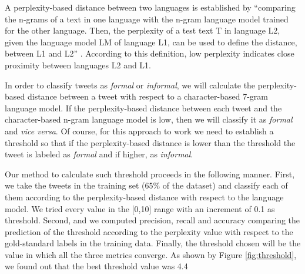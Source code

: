 \documentclass[information,article,submit,moreauthors,pdftex,10pt,a4paper]{Definitions/mdpi}
\begin{document}
A perplexity-based distance between two languages is established by ``comparing the n-grams of a text in one language with the n-gram language model trained for the other language. Then, the perplexity of a test text T in language L2, given the language model LM of language L1, can be used to define the distance, between L1 and L2'' \cite{gamallo2017language}. According to this definition, low perplexity indicates close proximity between languages L2 and L1.

In order to classify tweets as \emph{formal} or \emph{informal}, we will calculate the perplexity-based distance between a tweet with respect to a character-based 7-gram language model. If the perplexity-based distance between each tweet and the character-based n-gram language model is low, then we will classify it as \emph{formal} and \emph{vice versa}. Of course, for this approach to work we need to establish a threshold so that if the perplexity-based distance is lower than the threshold the tweet is labeled as \emph{formal} and if higher, as \emph{informal}.

Our method to calculate such threshold proceeds in the following manner. First, we take the tweets in the training set (65\% of the dataset) and classify each of them according to the perplexity-based distance with respect to the language model. We tried every value in the [0,10] range
with an increment of 0.1 as threshold. Second, and we computed precision, recall and accuracy comparing the prediction of the threshold according to the perplexity value with respect to the gold-standard labels in the training data. Finally, the threshold chosen will be the value in which all the three metrics converge. As shown by Figure \ref{fig:threshold}, we found out that the best threshold value was 4.4
\end{document}
